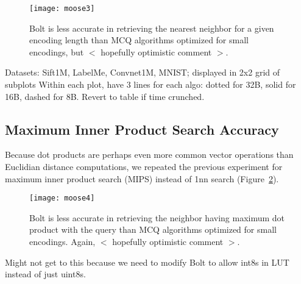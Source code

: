\begin{figure}[h]
\begin{center}
\label{fig:nn_acc}
\texttt{[image: moose3]}
\vspace*{-1mm}
\caption{Bolt is less accurate in retrieving the nearest neighbor for a given encoding length than MCQ algorithms optimized for small encodings, but $<$ hopefully optimistic comment $>$.}
\end{center}
\end{figure}

Datasets: Sift1M, LabelMe, Convnet1M, MNIST; displayed in 2x2 grid of subplots
Within each plot, have 3 lines for each algo: dotted for 32B, solid for 16B, dashed for 8B.
Revert to table if time crunched.



\subsection{Maximum Inner Product Search Accuracy}

Because dot products are perhaps even more common vector operations than Euclidian distance computations, we repeated the previous experiment for maximum inner product search (MIPS) instead of 1nn search (Figure~\ref{fig:mips_acc}).

\begin{figure}[h]
\begin{center}
\label{fig:mips_acc}
\texttt{[image: moose4]}
\vspace*{-1mm}
\caption{Bolt is less accurate in retrieving the neighbor having maximum dot product with the query than MCQ algorithms optimized for small encodings. Again, $<$ hopefully optimistic comment $>$.}
\end{center}
\end{figure}

Might not get to this because we need to modify Bolt to allow int8s in LUT instead of just uint8s.

